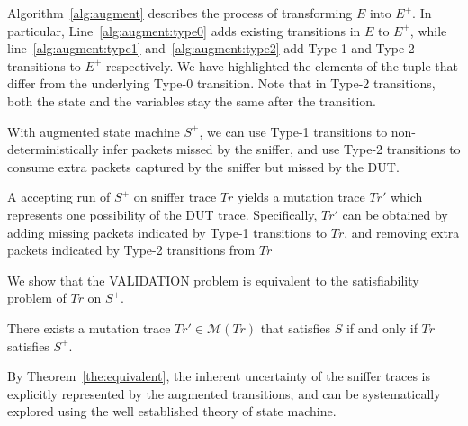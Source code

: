 Algorithm~\ref{alg:augment} describes the process of transforming $E$ into
$E^+$. In particular, Line~\ref{alg:augment:type0} adds existing transitions in
$E$ to $E^+$, while line~\ref{alg:augment:type1} and~\ref{alg:augment:type2} add
Type-1 and Type-2 transitions to $E^+$ respectively.  We have highlighted the
elements of the tuple that differ from the underlying Type-0 transition. Note
that in Type-2 transitions, both the state and the variables stay the same after
the transition.

With augmented state machine $S^+$, we can use Type-1 transitions to
non-deterministically infer packets missed by the sniffer, and use Type-2
transitions to consume extra packets captured by the sniffer but missed by the
DUT.

A accepting run of $S^+$ on sniffer trace $Tr$ yields a mutation trace $Tr'$
which represents one possibility of the DUT trace. Specifically, $Tr'$ can be
obtained by adding missing packets indicated by Type-1 transitions to $Tr$, and
removing extra packets indicated by Type-2 transitions from $Tr$

We show that the VALIDATION problem is equivalent to the
satisfiability problem of $Tr$ on $S^+$.

\begin{theorem}
  There exists a mutation trace $Tr' \in \mathcal{M}(Tr)$ that satisfies $S$ if
  and only if $Tr$ satisfies $S^+$.
 \label{the:equivalent}
\end{theorem}

By Theorem~\ref{the:equivalent}, the inherent uncertainty of the sniffer traces
is explicitly represented by the augmented transitions, and can be
systematically explored using the well established theory of state machine.


